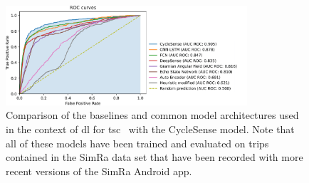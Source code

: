 \begin{figure}[t]
	\centering
	\includegraphics[width=0.8\textwidth]{fig/roc_auc_results_legend.png}
	\caption{Comparison of the baselines and common model architectures used in the context of \ac{dl} for \ac{tsc}~\cite{ismail2019deep} with the CycleSense model. Note that all of these models have been trained and evaluated on trips contained in the SimRa data set that have been recorded with more recent versions of the SimRa Android app.}
	\label{fig:roc-auc-results}
\end{figure}

\begin{table}
	\centering
\caption{Comparison of the baselines and common model architectures used in the context of \ac{dl} for \ac{tsc}~\cite{ismail2019deep} with the CycleSense model. See the discussion in Section~\ref{subsec:metrics} about the usefulness of various metrics. Note also that all of these models have been trained and evaluated on trips contained in the SimRa data set that have been recorded with more recent versions of the SimRa Android app. For all models the threshold which optimizes Youden's index\cite{youden1950index} were chosen.}
\label{tab:roc-auc-results}
\end{table}

